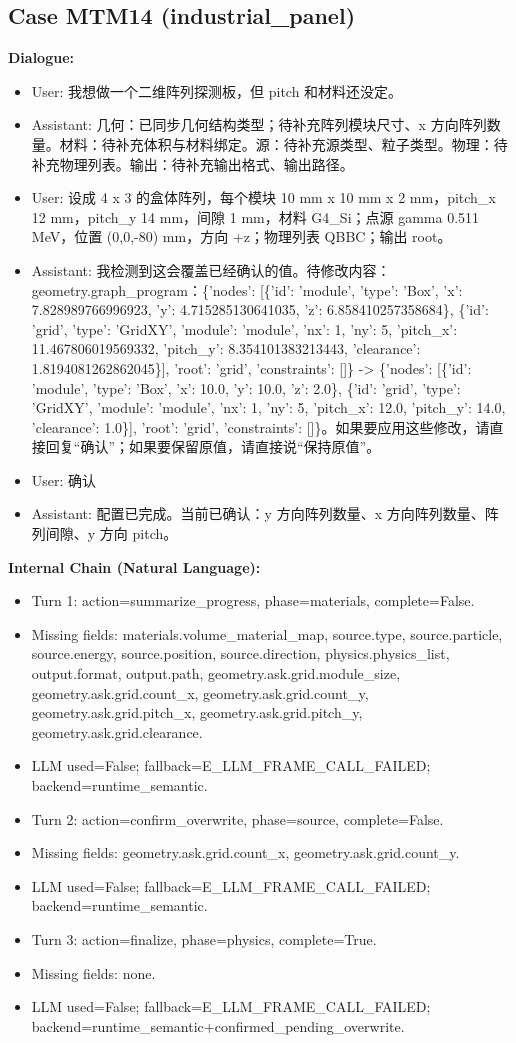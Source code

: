 \documentclass[11pt]{ctexart}
\begin{document}
\subsection{Case MTM14 (industrial\_panel)}
\textbf{Dialogue:}
\begin{itemize}
\item User: 我想做一个二维阵列探测板，但 pitch 和材料还没定。
\item Assistant: 几何：已同步几何结构类型；待补充阵列模块尺寸、x 方向阵列数量。材料：待补充体积与材料绑定。源：待补充源类型、粒子类型。物理：待补充物理列表。输出：待补充输出格式、输出路径。
\item User: 设成 4 x 3 的盒体阵列，每个模块 10 mm x 10 mm x 2 mm，pitch\_x 12 mm，pitch\_y 14 mm，间隙 1 mm，材料 G4\_Si；点源 gamma 0.511 MeV，位置 (0,0,-80) mm，方向 +z；物理列表 QBBC；输出 root。
\item Assistant: 我检测到这会覆盖已经确认的值。待修改内容：geometry.graph\_program：\{'nodes': [\{'id': 'module', 'type': 'Box', 'x': 7.828989766996923, 'y': 4.715285130641035, 'z': 6.858410257358684\}, \{'id': 'grid', 'type': 'GridXY', 'module': 'module', 'nx': 1, 'ny': 5, 'pitch\_x': 11.467806019569332, 'pitch\_y': 8.354101383213443, 'clearance': 1.8194081262862045\}], 'root': 'grid', 'constraints': []\} -> \{'nodes': [\{'id': 'module', 'type': 'Box', 'x': 10.0, 'y': 10.0, 'z': 2.0\}, \{'id': 'grid', 'type': 'GridXY', 'module': 'module', 'nx': 1, 'ny': 5, 'pitch\_x': 12.0, 'pitch\_y': 14.0, 'clearance': 1.0\}], 'root': 'grid', 'constraints': []\}。如果要应用这些修改，请直接回复“确认”；如果要保留原值，请直接说“保持原值”。
\item User: 确认
\item Assistant: 配置已完成。当前已确认：y 方向阵列数量、x 方向阵列数量、阵列间隙、y 方向 pitch。
\end{itemize}
\textbf{Internal Chain (Natural Language):}
\begin{itemize}
\item Turn 1: action=summarize\_progress, phase=materials, complete=False.
\item Missing fields: materials.volume\_material\_map, source.type, source.particle, source.energy, source.position, source.direction, physics.physics\_list, output.format, output.path, geometry.ask.grid.module\_size, geometry.ask.grid.count\_x, geometry.ask.grid.count\_y, geometry.ask.grid.pitch\_x, geometry.ask.grid.pitch\_y, geometry.ask.grid.clearance.
\item LLM used=False; fallback=E\_LLM\_FRAME\_CALL\_FAILED; backend=runtime\_semantic.
\item Turn 2: action=confirm\_overwrite, phase=source, complete=False.
\item Missing fields: geometry.ask.grid.count\_x, geometry.ask.grid.count\_y.
\item LLM used=False; fallback=E\_LLM\_FRAME\_CALL\_FAILED; backend=runtime\_semantic.
\item Turn 3: action=finalize, phase=physics, complete=True.
\item Missing fields: none.
\item LLM used=False; fallback=E\_LLM\_FRAME\_CALL\_FAILED; backend=runtime\_semantic+confirmed\_pending\_overwrite.
\end{itemize}
\end{document}
